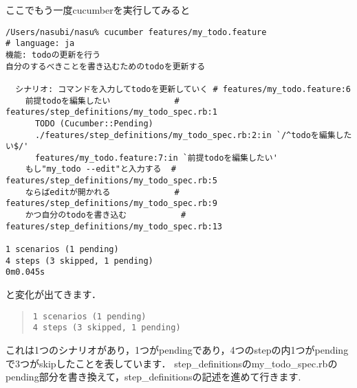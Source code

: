 ここでもう一度cucumberを実行してみると
\begin{lstlisting}[style=customCsh,basicstyle={\scriptsize\ttfamily}]
/Users/nasubi/nasu% cucumber features/my_todo.feature 
# language: ja
機能: todoの更新を行う
自分のするべきことを書き込むためのtodoを更新する

  シナリオ: コマンドを入力してtodoを更新していく # features/my_todo.feature:6
    前提todoを編集したい             # features/step_definitions/my_todo_spec.rb:1
      TODO (Cucumber::Pending)
      ./features/step_definitions/my_todo_spec.rb:2:in `/^todoを編集したい$/'
      features/my_todo.feature:7:in `前提todoを編集したい'
    もし"my_todo --edit"と入力する  # features/step_definitions/my_todo_spec.rb:5
    ならばeditが開かれる             # features/step_definitions/my_todo_spec.rb:9
    かつ自分のtodoを書き込む           # features/step_definitions/my_todo_spec.rb:13

1 scenarios (1 pending)
4 steps (3 skipped, 1 pending)
0m0.045s

\end{lstlisting}
と変化が出てきます．
\begin{quote}\begin{verbatim}
1 scenarios (1 pending)
4 steps (3 skipped, 1 pending)
\end{verbatim}\end{quote}
これは1つのシナリオがあり，1つがpendingであり，4つのstepの内1つがpendingで3つがskipしたことを表しています．
step\_definitionsのmy\_todo\_spec.rbのpending部分を書き換えて，step\_definitionsの記述を進めて行きます.

